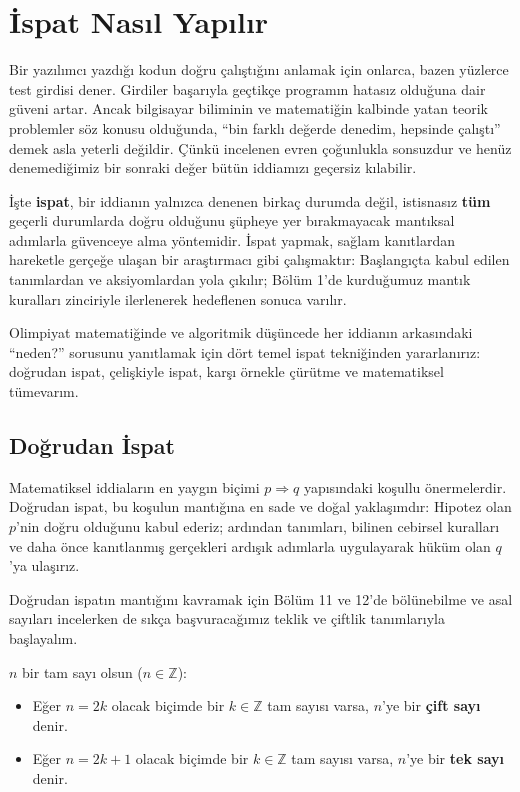 \chapter[İspat Nasıl Yapılır · \textit{Temel}]{İspat Nasıl Yapılır}

Bir yazılımcı yazdığı kodun doğru çalıştığını anlamak için onlarca, bazen yüzlerce test girdisi dener. Girdiler başarıyla geçtikçe programın hatasız olduğuna dair güveni artar. Ancak bilgisayar biliminin ve matematiğin kalbinde yatan teorik problemler söz konusu olduğunda, ``bin farklı değerde denedim, hepsinde çalıştı'' demek asla yeterli değildir. Çünkü incelenen evren çoğunlukla sonsuzdur ve henüz denemediğimiz bir sonraki değer bütün iddiamızı geçersiz kılabilir.

İşte \textbf{ispat}, bir iddianın yalnızca denenen birkaç durumda değil, istisnasız \textbf{tüm} geçerli durumlarda doğru olduğunu şüpheye yer bırakmayacak mantıksal adımlarla güvenceye alma yöntemidir. İspat yapmak, sağlam kanıtlardan hareketle gerçeğe ulaşan bir araştırmacı gibi çalışmaktır: Başlangıçta kabul edilen tanımlardan ve aksiyomlardan yola çıkılır; Bölüm 1'de kurduğumuz mantık kuralları zinciriyle ilerlenerek hedeflenen sonuca varılır.

Olimpiyat matematiğinde ve algoritmik düşüncede her iddianın arkasındaki ``neden?'' sorusunu yanıtlamak için dört temel ispat tekniğinden yararlanırız: doğrudan ispat, çelişkiyle ispat, karşı örnekle çürütme ve matematiksel tümevarım.

\section{Doğrudan İspat}

Matematiksel iddiaların en yaygın biçimi $p \Rightarrow q$ yapısındaki koşullu önermelerdir. Doğrudan ispat, bu koşulun mantığına en sade ve doğal yaklaşımdır: Hipotez olan $p$'nin doğru olduğunu kabul ederiz; ardından tanımları, bilinen cebirsel kuralları ve daha önce kanıtlanmış gerçekleri ardışık adımlarla uygulayarak hüküm olan $q$'ya ulaşırız.

Doğrudan ispatın mantığını kavramak için Bölüm 11 ve 12'de bölünebilme ve asal sayıları incelerken de sıkça başvuracağımız teklik ve çiftlik tanımlarıyla başlayalım.

\begin{definition}
$n$ bir tam sayı olsun ($n \in \mathbb{Z}$):
\begin{itemize}
  \item Eğer $n = 2k$ olacak biçimde bir $k \in \mathbb{Z}$ tam sayısı varsa, $n$'ye bir \textbf{çift sayı} denir.
  \item Eğer $n = 2k + 1$ olacak biçimde bir $k \in \mathbb{Z}$ tam sayısı varsa, $n$'ye bir \textbf{tek sayı} denir.
\end{itemize}
\end{definition}

